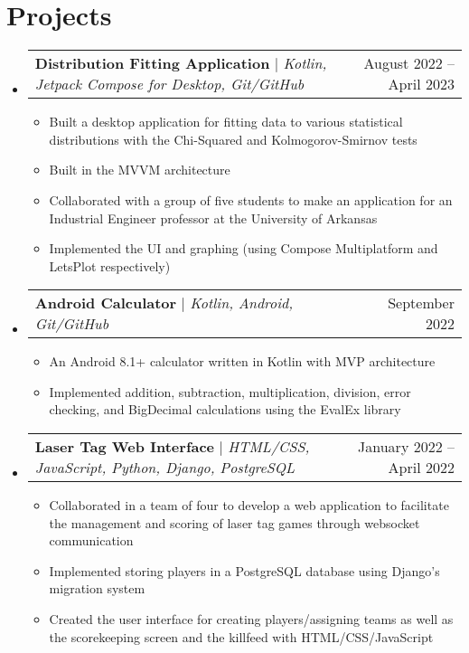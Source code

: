\documentclass[letterpaper,11pt]{article}
\makeatletter
\newcommand{\resumeItem}[1]{
  \item\small{
    {#1 \vspace{-2pt}}
  }
}
\newcommand{\resumeProjectHeading}[2]{
    \item
    \begin{tabular*}{0.97\textwidth}{l@{\extracolsep{\fill}}r}
      \small#1 & #2 \\
    \end{tabular*}\vspace{-7pt}
}
\newcommand{\resumeSubHeadingListStart}{\begin{itemize}[leftmargin=0.15in, label={}]}
\newcommand{\resumeSubHeadingListEnd}{\end{itemize}}
\newcommand{\resumeItemListStart}{\begin{itemize}}
\newcommand{\resumeItemListEnd}{\end{itemize}\vspace{-5pt}}
\makeatother
\begin{document}
\section{Projects}
    \resumeSubHeadingListStart
      \resumeProjectHeading
          {\textbf{Distribution Fitting Application} $|$ \emph{Kotlin, Jetpack Compose for Desktop, Git/GitHub}}{August 2022 -- April 2023}
          \resumeItemListStart
            \resumeItem{Built a desktop application for fitting data to various statistical distributions with the Chi-Squared and Kolmogorov-Smirnov tests}
            \resumeItem{Built in the MVVM architecture}
            \resumeItem{Collaborated with a group of five students to make an application for an Industrial Engineer professor at the University of Arkansas}
            \resumeItem{Implemented the UI and graphing (using Compose Multiplatform and LetsPlot respectively)}
          \resumeItemListEnd
      \resumeProjectHeading
          {\textbf{Android Calculator} $|$ \emph{Kotlin, Android, Git/GitHub}}{September 2022}
          \resumeItemListStart
            \resumeItem{An Android 8.1+ calculator written in Kotlin with MVP architecture}
            \resumeItem{Implemented addition, subtraction, multiplication, division, error checking, and BigDecimal calculations using the EvalEx library}
          \resumeItemListEnd
      \resumeProjectHeading
          {\textbf{Laser Tag Web Interface} $|$ \emph{HTML/CSS, JavaScript, Python, Django, PostgreSQL}}{January 2022 -- April 2022}
          \resumeItemListStart
            \resumeItem{Collaborated in a team of four to develop a web application to facilitate the management and scoring of laser tag games through websocket communication}
            \resumeItem{Implemented storing players in a PostgreSQL database using Django's migration system}
            \resumeItem{Created the user interface for creating players/assigning teams as well as the scorekeeping screen and the killfeed with HTML/CSS/JavaScript}
          \resumeItemListEnd
    \resumeSubHeadingListEnd



%



\end{document}
